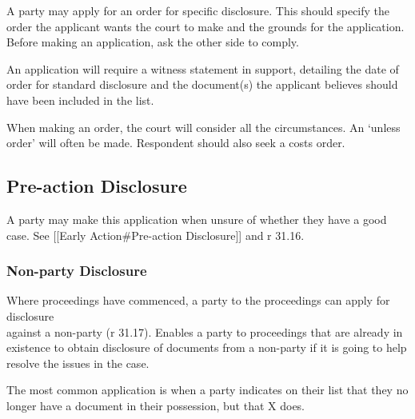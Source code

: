 \documentclass[
]{article}
\begin{document}
A party may apply for an order for specific disclosure. This should
specify the order the applicant wants the court to make and the grounds
for the application. Before making an application, ask the other side to
comply.

An application will require a witness statement in support, detailing
the date of order for standard disclosure and the document(s) the
applicant believes should have been included in the list.

When making an order, the court will consider all the circumstances. An
`unless order' will often be made. Respondent should also seek a costs
order.

\hypertarget{pre-action-disclosure}{%
\subsection{Pre-action Disclosure}\label{pre-action-disclosure}}

A party may make this application when unsure of whether they have a
good case. See {[}{[}Early Action\#Pre-action Disclosure{]}{]} and r
31.16.

\hypertarget{non-party-disclosure}{%
\subsubsection{Non-party Disclosure}\label{non-party-disclosure}}

Where proceedings have commenced, a party to the proceedings can apply
for disclosure\\
against a non-party (r 31.17). Enables a party to proceedings that are
already in existence to obtain disclosure of documents from a non-party
if it is going to help resolve the issues in the case.

The most common application is when a party indicates on their list that
they no longer have a document in their possession, but that X does.
\end{document}
